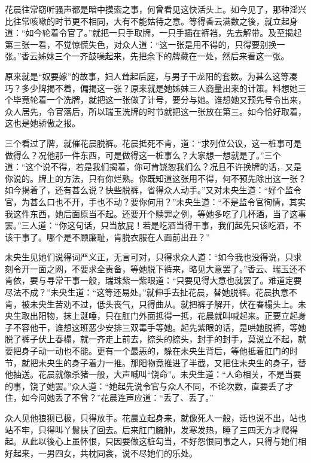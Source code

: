 \documentclass[a4paper,12pt,UTF8,twoside]{ctexbook}
\begin{document}
花晨往常窃听骚声都是暗中摸索之事，何曾看见这快活头上。如今见了，那种淫兴比往常咳嗽的时节更不相同，大有不能姑待之意。等得香云满数之後，就立起身道：“如今轮着令官了。”就把一只手取牌，一只手插在裤裆，先去解带。及至揭起第三张一看，不觉惊慌失色，对众人道：“这一张是用不得的，只得要别换一张。”香云姊妹三个一齐鼓噪起来，先把余下的牌藏在一处，然后来看这一张。

原来就是“奴要嫁”的故事，妇人耸起后庭，与男子干龙阳的套数。为甚么这等凑巧？多少牌揭不着，偏揭这一张？原来就是她姊妹三人商量出来的计策。料想她三个毕竟轮着一个洗牌，就把这一张做了计号，要分与她。谁想她又预先号令出来，众人居先，令官落后，所以瑞玉洗牌的时节就把这一张放在第三。如今恰好取着，这也是她骄傲之报。

三个看过了牌，就催花晨脱裤。花晨抵死不肯，道：“求列位公议，这一桩事可是做得么？况他那一件东西，可是做得这一桩事么？大家想一想就是了。”三个道：“这个说不得，若是我们揭着，你可肯饶恕我们么？况且不许换牌的话，又是你说的。牌上的方法，只有你烂熟。你既知道这张用不得，何不预先除出这一张？如今揭着了，还有甚么说？快些脱裤，省得众人动手。”又对未央生道：“好个监令官，为甚么口也不开，手也不动？要你何用？”未央生道：“不是监令官徇情，其实我这件东西，她后面原当不起。还要开个赎罪之例，等她多吃了几杯酒，当了这事罢。”三人道：“你这句话，只当放屁！若是吃酒当得干事，我们起先只该吃酒，不该干事了。哪个是不顾廉耻，肯脱衣服在人面前出丑？”

未央生见她们说得词严义正，无言可对，只得求众人道：“如今我也没得说，只求刻令开一面之网，不要求全责备，等她脱下裤来，略见大意罢了。”香云、瑞玉还不肯依，要与寻常干事一般，瑞珠紫一紫眼道：“只要见得大意也就罢了。难道定要尽法不成？”未央生道：“这等还易处。”就伸手去扯花晨，替她脱裤。花晨执意不肯，被未央生苦劝不过，低头丧气，只得曲从。就把裤子解开，伏在春榻头上。未央生取出阳物，抹上涎唾，只在肛门外面抵得一抵，花晨就叫喊起来。正要立起身子不容他干，谁想这班恶少安排三双毒手等她。起先紫眼的话，是哄她脱裤，等她脱了裤子伏上春榻，就一齐走上前去，捺头的捺头，封手的封手，莫说立不起，就要把身子动一动也不能。更有一个最恶的，躲在未央生背后，等他抵着肛门的时节，就把未央生的身子着力一推。那阳物竟推进了半截，又把住未央生的身子，替他抽送。花晨就像杀猪一般，大声喊叫“饶命”。未央生道：“人命相关，不是当要的事，饶了她罢。”众人道：“她起先说令官与众人不同，不论次数，直要丢了才住，如今问她丢了不曾？”花晨连声应道：“丢了、丢了。”

众人见他狼狈已极，只得放手。花晨立起身来，就像死人一般，话也说不出，站也站不牢，只得叫丫鬟扶了回去。后来肛门臃肿，发寒发热，睡了三四天方才爬得起。从此以後心上虽怀恨，只因要做这桩勾当，不好怨恨同事之人，只得与她们相好起来，一男四女，共枕同衾，说不尽她们的乐处。
\end{document}
